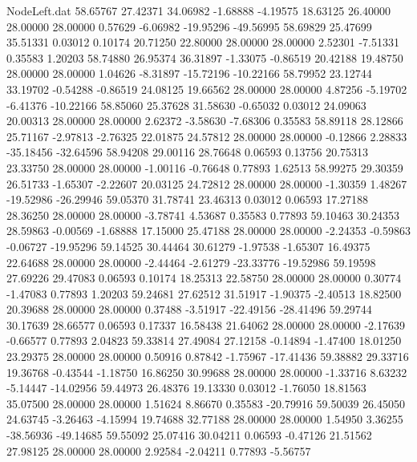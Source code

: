 \begin{filecontents}{NodeLeft.dat}
  58.65767   27.42371   34.06982    -1.68888   -4.19575   18.63125   26.40000   28.00000   28.00000    0.57629   -6.06982  -19.95296  -49.56995
  58.69829   25.47699   35.51331     0.03012    0.10174   20.71250   22.80000   28.00000   28.00000    2.52301   -7.51331    0.35583    1.20203
  58.74880   26.95374   36.31897    -1.33075   -0.86519   20.42188   19.48750   28.00000   28.00000    1.04626   -8.31897  -15.72196  -10.22166
  58.79952   23.12744   33.19702    -0.54288   -0.86519   24.08125   19.66562   28.00000   28.00000    4.87256   -5.19702   -6.41376  -10.22166
  58.85060   25.37628   31.58630    -0.65032    0.03012   24.09063   20.00313   28.00000   28.00000    2.62372   -3.58630   -7.68306    0.35583
  58.89118   28.12866   25.71167    -2.97813   -2.76325   22.01875   24.57812   28.00000   28.00000   -0.12866    2.28833  -35.18456  -32.64596
  58.94208   29.00116   28.76648     0.06593    0.13756   20.75313   23.33750   28.00000   28.00000   -1.00116   -0.76648    0.77893    1.62513
  58.99275   29.30359   26.51733    -1.65307   -2.22607   20.03125   24.72812   28.00000   28.00000   -1.30359    1.48267  -19.52986  -26.29946
  59.05370   31.78741   23.46313     0.03012    0.06593   17.27188   28.36250   28.00000   28.00000   -3.78741    4.53687    0.35583    0.77893
  59.10463   30.24353   28.59863    -0.00569   -1.68888   17.15000   25.47188   28.00000   28.00000   -2.24353   -0.59863   -0.06727  -19.95296
  59.14525   30.44464   30.61279    -1.97538   -1.65307   16.49375   22.64688   28.00000   28.00000   -2.44464   -2.61279  -23.33776  -19.52986
  59.19598   27.69226   29.47083     0.06593    0.10174   18.25313   22.58750   28.00000   28.00000    0.30774   -1.47083    0.77893    1.20203
  59.24681   27.62512   31.51917    -1.90375   -2.40513   18.82500   20.39688   28.00000   28.00000    0.37488   -3.51917  -22.49156  -28.41496
  59.29744   30.17639   28.66577     0.06593    0.17337   16.58438   21.64062   28.00000   28.00000   -2.17639   -0.66577    0.77893    2.04823
  59.33814   27.49084   27.12158    -0.14894   -1.47400   18.01250   23.29375   28.00000   28.00000    0.50916    0.87842   -1.75967  -17.41436
  59.38882   29.33716   19.36768    -0.43544   -1.18750   16.86250   30.99688   28.00000   28.00000   -1.33716    8.63232   -5.14447  -14.02956
  59.44973   26.48376   19.13330     0.03012   -1.76050   18.81563   35.07500   28.00000   28.00000    1.51624    8.86670    0.35583  -20.79916
  59.50039   26.45050   24.63745    -3.26463   -4.15994   19.74688   32.77188   28.00000   28.00000    1.54950    3.36255  -38.56936  -49.14685
  59.55092   25.07416   30.04211     0.06593   -0.47126   21.51562   27.98125   28.00000   28.00000    2.92584   -2.04211    0.77893   -5.56757

\end{filecontents}
